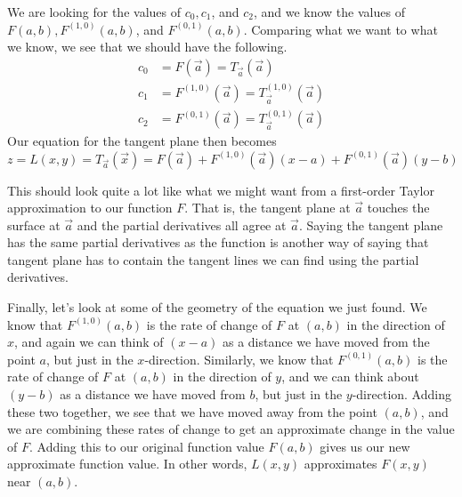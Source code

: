 \documentclass{ximera}
\begin{document}
We are looking for the values of $c_0, c_1$, and $c_2$, and we know the values of 
$F(a,b), F^{(1,0)}(a,b)$, and $F^{(0,1)}(a,b)$.  Comparing what we want to what we 
know, we see that we should have the following.
\begin{align*}
c_0 &= F(\vec{a})=T_{\vec{a}}(\vec{a}) \\
c_1 & = F^{(1,0)}(\vec{a})= T_{\vec{a}}^{(1,0)}(\vec{a})\\
c_2 &= F^{(0,1)}(\vec{a})= T_{\vec{a}}^{(0,1)}(\vec{a})
\end{align*}
Our equation for the tangent plane then becomes
\[
z = L(x,y) = T_{\vec{a}}(\vec{x})=F(\vec{a})+ F^{(1,0)}(\vec{a}) (x-a)+ F^{(0,1)}(\vec{a}) (y-b)
\]

This should look quite a lot like what we might want from a first-order Taylor 
approximation to our function $F$.  That is, the tangent plane at $\vec{a}$ touches 
the surface at $\vec{a}$ and the partial derivatives all agree at $\vec{a}$.  Saying the 
tangent plane has the same partial derivatives as the function is another way of 
saying that tangent plane has to contain the tangent lines we can find using the 
partial derivatives.

Finally, let's look at some of the geometry of the equation we just found.  We know 
that $F^{(1,0)}(a,b)$ is the rate of change of $F$ at $(a,b)$ in the direction of $x$, 
and again we can think of $(x-a)$ as a distance we have moved from the point $a$, 
but just in the $x$-direction.  Similarly, we know that $F^{(0,1)}(a,b)$ is the rate of 
change of $F$ at $(a,b)$ in the direction of $y$, and we can think about $(y-b)$ as a 
distance we have moved from $b$, but just in the $y$-direction.  Adding these two 
together, we see that we have moved away from the point $(a,b)$, and we are 
combining these rates of change to get an approximate change in the value of $F$.  
Adding this to our original function value $F(a,b)$ gives us our new approximate 
function value.  In other words, $L(x,y)$ approximates $F(x,y)$ near $(a,b)$.
\end{document}
